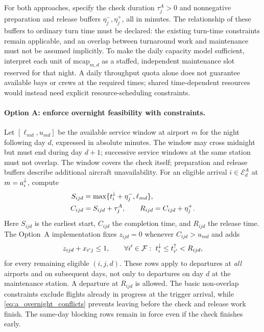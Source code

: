 For both approaches, specify the check duration $\tau^A_j>0$ and nonnegative
preparation and release buffers $\eta^-_j,\eta^+_j$, all in minutes. The
relationship of these buffers to ordinary turn time must be declared:
the existing turn-time constraints remain applicable, and an overlap between
turnaround work and maintenance must not be assumed implicitly. To make
the daily capacity model sufficient, interpret each unit of
$\mathrm{mcap}_{m,d}$ as a staffed, independent maintenance slot reserved
for that night. A daily throughput quota alone does not guarantee available
bays or crews at the required times; shared time-dependent resources would
instead need explicit resource-scheduling constraints.

\paragraph{Option A: enforce overnight feasibility with constraints.}
Let $[\ell_{md},u_{md}]$ be the available service window at airport $m$
for the night following day $d$, expressed in absolute minutes. The window
may cross midnight but must end during day $d+1$; successive service
windows at the same station must not overlap. The window covers the check
itself; preparation and release buffers describe additional aircraft
unavailability. For an eligible arrival
$i\in\mathcal{E}^A_d$ at $m=a^{\downarrow}_{i}$, compute
\begin{align}
  S_{ijd}&=\max\{t^{\downarrow}_{i}+\eta^-_j,\ell_{md}\},
    \label{eq:a_overnight_start}\\
  C_{ijd}&=S_{ijd}+\tau^A_j,\qquad
  R_{ijd}=C_{ijd}+\eta^+_j.
    \label{eq:a_overnight_release}
\end{align}
Here $S_{ijd}$ is the earliest start, $C_{ijd}$ the completion time, and
$R_{ijd}$ the release time. The Option~A implementation fixes $z_{ijd}=0$
whenever $C_{ijd}>u_{md}$ and adds
\begin{equation}\label{eq:a_overnight_conflicts}
  z_{ijd}+x_{i'j}\le1,
  \qquad \forall i'\in\mathcal{F}:\ t^{\downarrow}_{i}\le t^{\uparrow}_{i'}<R_{ijd},
\end{equation}
for every remaining eligible $(i,j,d)$. These rows apply to departures at
\emph{all} airports and on subsequent days, not only to departures on day
$d$ at the maintenance station. A departure at $R_{ijd}$ is allowed.
The basic non-overlap constraints exclude flights already in progress at
the trigger arrival, while \eqref{eq:a_overnight_conflicts} prevents leaving
before the check and release work finish. The same-day blocking rows remain
in force even if the check finishes early.

